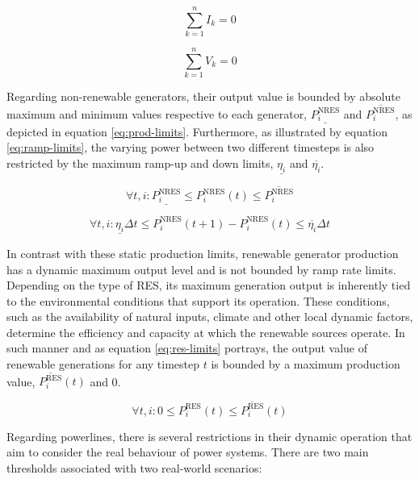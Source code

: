 \begin{equation}
	\sum_{k=1}^n  I_k = 0
\end{equation}

\begin{equation}
	\sum_{k=1}^n  V_k = 0
\end{equation}

Regarding non-renewable generators, their output value is bounded by absolute maximum and minimum values respective to each generator, $\underline{P^\text{NRES}_i}$ and $\overline{P^\text{NRES}_i}$, as depicted in equation \ref{eq:prod-limits}. Furthermore, as illustrated by equation \ref{eq:ramp-limits}, the varying power between two different timesteps is also restricted by the maximum ramp-up and down limits, $\underline{\eta_i }$ and $\overline{\eta_i }$. \par

\begin{equation} \label{eq:prod-limits}
	\forall t, i: \underline{P^\text{NRES}_i} \leq P^\text{NRES}_i(t) \leq \overline{P^\text{NRES}_i}
\end{equation}

\begin{equation} \label{eq:ramp-limits}
	\forall t, i: \underline{\eta_i } \Delta t \leq P^\text{NRES}_i (t + 1) - P^\text{NRES}_i (t) \leq \overline{\eta_i} \Delta t
\end{equation}

In contrast with these static production limits, renewable generator production has a dynamic maximum output level and is not bounded by ramp rate limits. Depending on the type of \ac{RES}, its maximum generation output is inherently tied to the environmental conditions that support its operation. These conditions, such as the availability of natural inputs, climate and other local dynamic factors, determine the efficiency and capacity at which the renewable sources operate. In such manner and as equation \ref{eq:res-limits} portrays, the output value of renewable generations for any timestep $t$ is bounded by a maximum production value, $\overline{P^\text{RES}_i} (t)$ and 0.

\begin{equation} \label{eq:res-limits}
	\forall t, i: 0 \leq P^\text{RES}_i (t) \leq \overline{P^\text{RES}_i} (t)
\end{equation}

Regarding powerlines, there is several restrictions in their dynamic operation that aim to consider the real behaviour of power systems. There are two main thresholds associated with two real-world scenarios:

